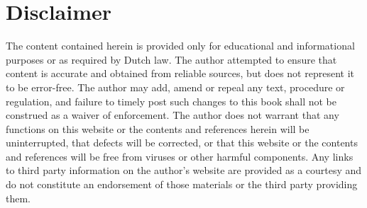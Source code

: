 \documentclass[
]{book}
\begin{document}
\hypertarget{disclaimer}{%
\section{Disclaimer}\label{disclaimer}}

The content contained herein is provided only for educational and informational purposes or as required by Dutch law. The author attempted to ensure that content is accurate and obtained from reliable sources, but does not represent it to be error-free. The author may add, amend or repeal any text, procedure or regulation, and failure to timely post such changes to this book shall not be construed as a waiver of enforcement. The author does not warrant that any functions on this website or the contents and references herein will be uninterrupted, that defects will be corrected, or that this website or the contents and references will be free from viruses or other harmful components. Any links to third party information on the author's website are provided as a courtesy and do not constitute an endorsement of those materials or the third party providing them.

  
\end{document}
